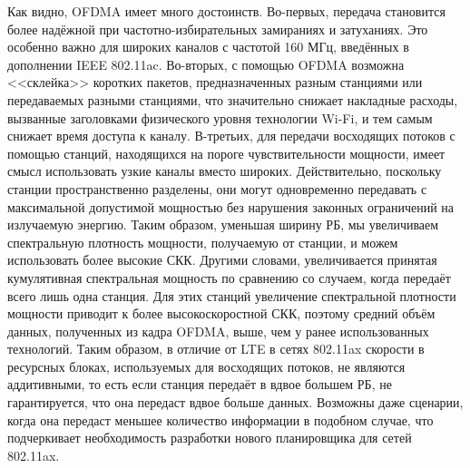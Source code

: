Как видно, OFDMA имеет много достоинств. 
Во-первых, передача становится более надёжной при частотно-избирательных замираниях и затуханиях. 
Это особенно важно для широких каналов с частотой 160 МГц, введённых в дополнении IEEE 802.11ac. 
Во-вторых, с помощью OFDMA возможна <<склейка>> коротких пакетов, предназначенных разным станциями или передаваемых разными станциями, что значительно снижает накладные расходы, вызванные заголовками физического уровня технологии Wi-Fi, и тем самым снижает время доступа к каналу.
В-третьих, для передачи восходящих потоков с помощью станций, находящихся на пороге чувствительности мощности, имеет смысл использовать узкие каналы вместо широких. 
Действительно, поскольку станции пространственно разделены, они могут одновременно передавать с максимальной допустимой мощностью без нарушения законных ограничений на излучаемую энергию.
Таким образом, уменьшая ширину РБ, мы увеличиваем спектральную плотность мощности, получаемую от станции, и можем использовать более высокие СКК. 
Другими словами, увеличивается принятая кумулятивная спектральная мощность по сравнению со случаем, когда передаёт всего лишь одна станция. 
Для этих станций увеличение спектральной плотности мощности приводит к более высокоскоростной СКК, поэтому средний объём данных, полученных из кадра OFDMA, выше, чем у ранее использованных технологий. 
Таким образом, в отличие от LTE в сетях 802.11ax скорости в ресурсных блоках, используемых для восходящих потоков, не являются аддитивными, то есть если станция передаёт в вдвое большем РБ, не гарантируется, что она передаст вдвое больше данных. Возможны даже сценарии, когда она передаст меньшее количество информации в подобном случае, что подчеркивает необходимость разработки нового планировщика для сетей 802.11ax.
